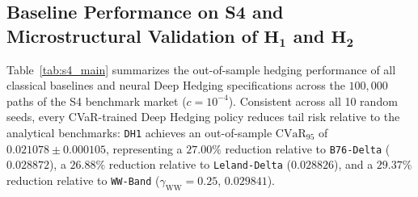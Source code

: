 \documentclass[11pt,a4paper]{article}
\begin{document}
\begin{enumerate}
Matter\dots''}) rather than unconditional unconstrained jump-filtering superiority.
\end{enumerate}

\subsection{Baseline Performance on S4 and Microstructural Validation of $\mathbf{H_1}$ and $\mathbf{H_2}$}
\label{sec:s4_results}
Table~\ref{tab:s4_main} summarizes the out-of-sample hedging performance of all classical baselines and neural Deep Hedging specifications across the $100,000$ paths of the S4 benchmark market ($c = 10^{-4}$). Consistent across all 10 random seeds, every CVaR-trained Deep Hedging policy reduces tail risk relative to the analytical benchmarks: \texttt{DH1} achieves an out-of-sample $\text{CVaR}_{95}$ of $0.021078 \pm 0.000105$, representing a $27.00\%$ reduction relative to \texttt{B76-Delta} ($0.028872$), a $26.88\%$ reduction relative to \texttt{Leland-Delta} ($0.028826$), and a $29.37\%$ reduction relative to \texttt{WW-Band} ($\gamma_{\text{WW}} = 0.25$, $0.029841$).
\end{document}
